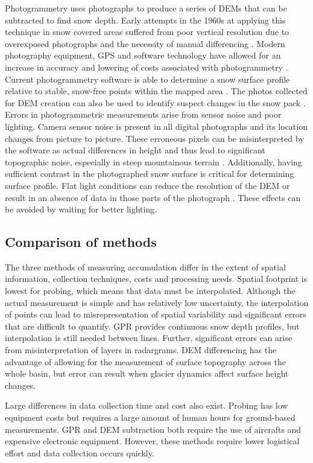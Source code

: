 \documentclass{sfuthesis}
\begin{document}
\begin{appendices}
Photogrammetry uses photographs to produce a series of DEMs that can be subtracted to find snow depth. Early attempts in the 1960s at applying this technique in snow covered areas suffered from poor vertical resolution due to overexposed photographs and the necessity of manual differencing \citep{Nolan2015}. Modern photography equipment, GPS and software technology have allowed for an increase in accuracy and lowering of costs associated with photogrammetry \citep{Nolan2015}. Current photogrammetry software is able to determine a snow surface profile relative to stable, snow-free points within the mapped area \citep{Farinotti2010}. The photos collected for DEM creation can also be used to identify suspect changes in the snow pack \citep{Nolan2015}.
Errors in photogrammetric measurements arise from sensor noise and poor lighting. Camera sensor noise is present in all digital photographs and its location changes from picture to picture. These erroneous pixels can be misinterpreted by the software as actual differences in height and thus lead to significant topographic noise, especially in steep mountainous terrain \citep{Nolan2015}. Additionally, having sufficient contrast in the photographed snow surface is critical for determining surface profile. Flat light conditions can reduce the resolution of the DEM or result in an absence of data in those parts of the photograph \citep{Nolan2015}. These effects can be avoided by waiting for better lighting.

\subsection{Comparison of methods}
\label{sec:comparemethods}
The three methods of measuring accumulation differ in the extent of spatial information, collection techniques, costs and processing needs. Spatial footprint is lowest for probing, which means that data must be interpolated. Although the actual measurement is simple and has relatively low uncertainty, the interpolation of points can lead to misrepresentation of spatial variability and significant errors that are difficult to quantify. GPR provides continuous snow depth profiles, but interpolation is still needed between lines. Further, significant errors can arise from misinterpretation of layers in radargrams. DEM differencing has the advantage of allowing for the measurement of surface topography across the whole basin, but error can result when glacier dynamics affect surface height changes. 

Large differences in data collection time and cost also exist. Probing has low equipment costs but requires a large amount of human hours for ground-based measurements. GPR and DEM subtraction both require the use of aircrafts and expensive electronic equipment. However, these methods require lower logistical effort and data collection occurs quickly.  


\end{appendices}
\end{document}
